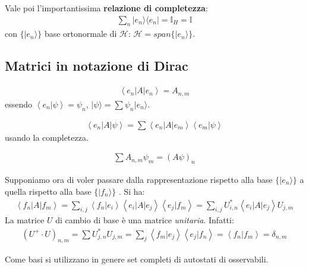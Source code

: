 Vale poi l'importantissima \textbf{relazione di completezza}:
\begin{equation}\begin{split}
\sum_{n}|e_n\rangle\langle e_n|= \mathbb{I}_H=\mathbb{I}
\end{split}\end{equation}
con $\{|e_n\rangle\}$ base ortonormale di $\mathcal{H}$: $\mathcal{H}=span\{ |e_n\rangle \}$.

\subsection{Matrici in notazione di Dirac} %
\begin{equation}\begin{split}
\left\langle e_n|A|e_n \right\rangle=A_{n,m}
\end{split}\end{equation}
essendo $\left\langle e_n|\psi  \right\rangle=\psi _n$, $|\psi \rangle =\sum{\psi _n | e_n \rangle}$.

\begin{equation}\begin{split}
\left\langle e_n|A|\psi  \right\rangle=\sum\left\langle e_n|A|e_m \right\rangle\left\langle e_m|\psi  \right\rangle
\end{split}\end{equation}
usando la completezza.

\begin{equation}\begin{split}
\sum{A_{n,m}\psi _m}=\left(A\psi \right)_n
\end{split}\end{equation}

Supponiamo ora di voler passare dalla rappresentazione rispetto alla base $\{|e_n\rangle \}$ a quella rispetto alla base $\{|f_n\rangle \}$ .
Si ha:
\begin{equation}\begin{split}
\left\langle f_n|A|f_m \right\rangle = \sum_{i,j}{\left\langle f_n|e_i \right\rangle\left\langle e_i|A|e_j \right\rangle\left\langle e_j|f_m \right\rangle} 
=\sum_{i,j}{U^*_{i,n}\left\langle e_i|A|e_j \right\rangle U_{j,m}}
\end{split}\end{equation}
La matrice $U$ di cambio di base è una matrice \emph{unitaria}. Infatti:
\begin{equation}\begin{split}
\left(U^+\cdot U\right)_{n,m}=\sum{U^*_{j,n}U_{j,m}}=\sum_j\left\langle f_m|e_j \right\rangle\left\langle e_j|f_n \right\rangle=\left\langle f_n|f_m \right\rangle=\delta_{n,m}
\end{split}\end{equation}

Come basi si utilizzano in genere set completi di autostati di osservabili.
%